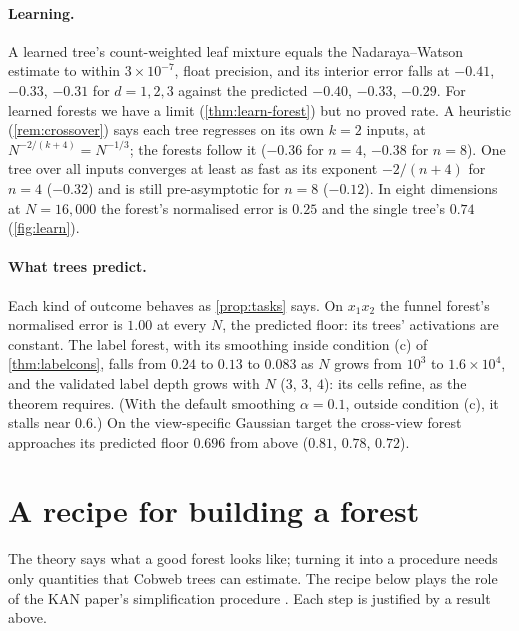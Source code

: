 \documentclass[11pt]{article}
\theoremstyle{definition}
\theoremstyle{remark}
\begin{document}
\paragraph{Learning.}
A learned tree's count-weighted leaf mixture equals the Nadaraya--Watson
estimate to within $3\times10^{-7}$, float precision, and its interior error falls at $-0.41$,
$-0.33$, $-0.31$ for $d=1,2,3$ against the predicted $-0.40$, $-0.33$, $-0.29$.  For learned
forests we have a limit (\cref{thm:learn-forest}) but no proved rate.  A heuristic
(\cref{rem:crossover}) says each tree regresses on its own $k=2$ inputs, at
$N^{-2/(k+4)}=N^{-1/3}$; the forests follow it ($-0.36$ for $n=4$, $-0.38$ for $n=8$).  One tree
over all inputs converges at least as fast as its exponent $-2/(n+4)$ for $n=4$ ($-0.32$) and
is still pre-asymptotic for $n=8$ ($-0.12$).  In eight dimensions at $N=16{,}000$ the forest's
normalised error is $0.25$ and the single tree's $0.74$ (\cref{fig:learn}).

\paragraph{What trees predict.}
Each kind of outcome behaves as \cref{prop:tasks} says.  On $x_1x_2$ the funnel forest's
normalised error is $1.00$ at every $N$, the predicted floor: its trees' activations are
constant.  The label forest, with its smoothing inside condition (c) of \cref{thm:labelcons},
falls from $0.24$ to $0.13$ to $0.083$ as $N$ grows from $10^3$ to $1.6\times10^4$, and the
validated label depth grows with $N$ ($3$, $3$, $4$): its cells refine, as the theorem requires.
(With the default smoothing $\alpha=0.1$, outside condition (c), it stalls near $0.6$.)  On the
view-specific Gaussian target the cross-view forest approaches its predicted floor $0.696$ from
above ($0.81$, $0.78$, $0.72$).

\section{A recipe for building a forest}\label{sec:recipe}

The theory says what a good forest looks like; turning it into a procedure needs only
quantities that Cobweb trees can estimate.  The recipe below plays the role of the KAN
paper's simplification procedure \citep{liu2024kan}.  Each step is justified by a result
above.
\end{document}
